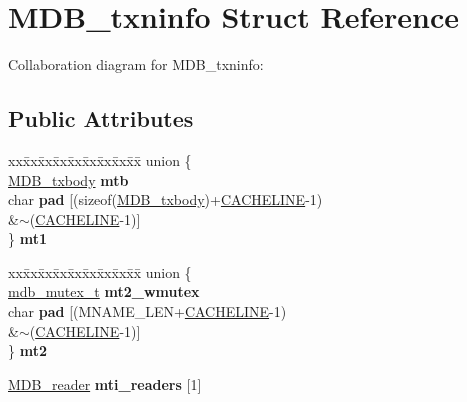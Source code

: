 \hypertarget{struct_m_d_b__txninfo}{}\section{M\+D\+B\+\_\+txninfo Struct Reference}
\label{struct_m_d_b__txninfo}


Collaboration diagram for M\+D\+B\+\_\+txninfo\+:
\subsection*{Public Attributes}
\begin{DoxyCompactItemize}
\item 
\mbox{\label{struct_m_d_b__txninfo_a53cb5f52ac49f4d085ccac3df6bfaae2}} 
\begin{tabbing}
xx\=xx\=xx\=xx\=xx\=xx\=xx\=xx\=xx\=\kill
union \{\\
\>\mbox{\hyperlink{struct_m_d_b__txbody}{MDB\_txbody}} {\bfseries mtb}\\
\>char {\bfseries pad} \mbox{[}(sizeof(\mbox{\hyperlink{struct_m_d_b__txbody}{MDB\_txbody}})+\mbox{\hyperlink{group__readers_gaa62717a1fae2c57f94f2a9b8ae08ec49}{CACHELINE}}-\/1) \\
\>\>\&$\sim$(\mbox{\hyperlink{group__readers_gaa62717a1fae2c57f94f2a9b8ae08ec49}{CACHELINE}}-\/1)\mbox{]}\\
\} {\bfseries mt1}\\

\end{tabbing}\item 
\mbox{\label{struct_m_d_b__txninfo_a189bfb18438f231dd8dd0d5a96c37b93}} 
\begin{tabbing}
xx\=xx\=xx\=xx\=xx\=xx\=xx\=xx\=xx\=\kill
union \{\\
\>\mbox{\hyperlink{group__compat_ga9b7b61d0ad68b601d11d93e5c1193391}{mdb\_mutex\_t}} {\bfseries mt2\_wmutex}\\
\>char {\bfseries pad} \mbox{[}(MNAME\_LEN+\mbox{\hyperlink{group__readers_gaa62717a1fae2c57f94f2a9b8ae08ec49}{CACHELINE}}-\/1) \\
\>\>\&$\sim$(\mbox{\hyperlink{group__readers_gaa62717a1fae2c57f94f2a9b8ae08ec49}{CACHELINE}}-\/1)\mbox{]}\\
\} {\bfseries mt2}\\

\end{tabbing}\item 
\mbox{\label{struct_m_d_b__txninfo_a117ef3a179ebedd591908fc6051e16ee}} 
\mbox{\hyperlink{struct_m_d_b__reader}{M\+D\+B\+\_\+reader}} {\bfseries mti\+\_\+readers} \mbox{[}1\mbox{]}
\end{DoxyCompactItemize}


